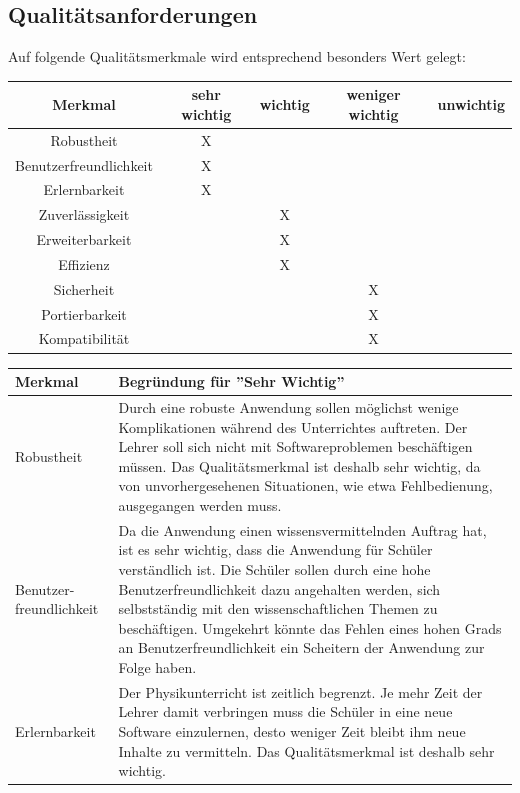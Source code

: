 \documentclass[parskip=full]{scrartcl}
\begin{document}
\subsection{Qualitätsanforderungen}\label{quali}

Auf folgende Qualitätsmerkmale wird entsprechend besonders Wert gelegt:

\begin{tabular}{ | c | c | c | c | c | }
	\hline
	\textbf{Merkmal} & \textbf{sehr wichtig} & \textbf{wichtig} & \textbf{weniger wichtig} & \textbf{unwichtig} \\
	\hline
	Robustheit & X & & & \\
	Benutzerfreundlichkeit & X & & & \\
	Erlernbarkeit & X & & & \\
	Zuverlässigkeit & & X & & \\
	Erweiterbarkeit & & X & & \\
	Effizienz & & X & & \\
	Sicherheit & & & X & \\
	Portierbarkeit & & & X & \\
	Kompatibilität & & & X & \\
	\hline
\end{tabular}

\begin{tabular}{| p{3cm} | p{10cm} |}
	\hline
	\textbf{Merkmal} & \textbf{Begründung für ''Sehr Wichtig''}\\
	\hline
	
	Robustheit & Durch eine robuste Anwendung sollen möglichst wenige Komplikationen während des Unterrichtes auftreten. Der Lehrer soll sich nicht mit Softwareproblemen beschäftigen müssen. Das Qualitätsmerkmal ist deshalb sehr wichtig, da von unvorhergesehenen Situationen, wie etwa Fehlbedienung, ausgegangen werden muss.\\\cline{1-2}
	
	Benutzer-\newline freundlichkeit & Da die Anwendung einen wissensvermittelnden Auftrag hat, ist es sehr wichtig, dass die Anwendung für Schüler verständlich ist. Die Schüler sollen durch eine hohe Benutzerfreundlichkeit dazu angehalten werden, sich selbstständig mit den wissenschaftlichen Themen zu beschäftigen. Umgekehrt könnte das Fehlen eines hohen Grads an Benutzerfreundlichkeit ein Scheitern der Anwendung zur Folge haben.\\\cline{1-2}
	
	Erlernbarkeit & Der Physikunterricht ist zeitlich begrenzt. Je mehr Zeit der Lehrer damit verbringen muss die Schüler in eine neue Software einzulernen, desto weniger Zeit bleibt ihm neue Inhalte zu vermitteln. Das Qualitätsmerkmal ist deshalb sehr wichtig.\\\cline{1-2}
\end{tabular}
\end{document}
